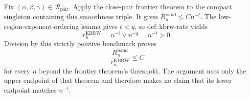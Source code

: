 Fix \((\alpha,\beta,\gamma)\in\mathcal R_{\mathrm{pair}}\).  Apply the
close-pair frontier theorem to the compact singleton containing this
smoothness triple.  It gives \(R_n^{\mathrm{band}}\leq Cn^{-t}\).  The
low-region-exponent-ordering lemma gives \(t<q\), so
\(\mathrm{def:kbrw\mbox{-}rate}\) yields
\[
r_n^{\mathrm{KBRW}}=n^{-t}\vee n^{-q}=n^{-t}>0.
\]
Division by this strictly positive benchmark proves
\[
\frac{R_n^{\mathrm{band}}}{r_n^{\mathrm{KBRW}}}\leq C
\]
for every \(n\) beyond the frontier theorem's threshold.  The argument uses
only the upper endpoint of that theorem and therefore makes no claim that its
lower endpoint matches \(n^{-t}\).